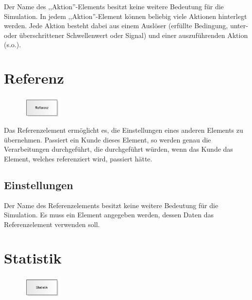Der Name des ,,Aktion''-Elements besitzt keine weitere Bedeutung für die Simulation.
In jedem ,,Aktion''-Element können beliebig viele Aktionen hinterlegt werden. Jede
Aktion besteht dabei aus einem Auslöser (erfüllte Bedingung, unter- oder überschrittener
Schwellenwert oder Signal) und einer auszuführenden Aktion (s.o.).


\section{Referenz}
\label{ref:ModelElementReference}

\begin{figure}
\vspace{-22pt}
\includegraphics[width=2cm]{imageModelElementReference.png}
\vspace{-22pt}
\end{figure}

Das Referenzelement ermöglicht es, die Einstellungen eines anderen Elements zu übernehmen.
Passiert ein Kunde dieses Element, so werden genau die Verarbeitungen durchgeführt, die
durchgeführt würden, wenn das Kunde das Element, welches referenziert wird, passiert hätte.

\subsection*{Einstellungen}

Der Name des Referenzelements besitzt keine weitere Bedeutung für die Simulation.
Es muss ein Element angegeben werden, dessen Daten das Referenzelement verwenden soll.


\section{Statistik}
\label{ref:ModelElementUserStatistic}

\begin{figure}
\vspace{-22pt}
\includegraphics[width=2cm]{imageModelElementUserStatistic.png}
\vspace{-22pt}
\end{figure}

